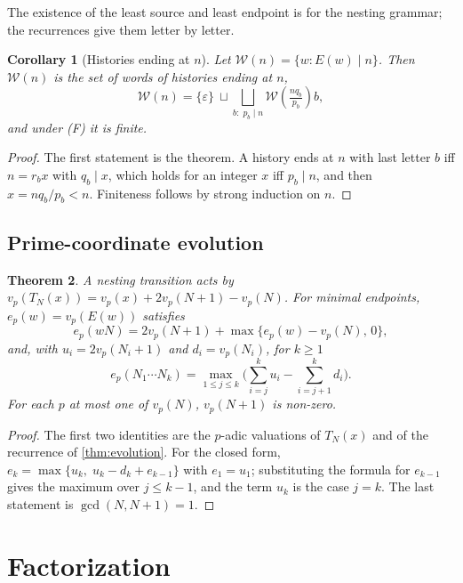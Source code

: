 \documentclass[11pt,a4paper]{article}
\newtheorem{theorem}{Theorem}[section]
\newtheorem{corollary}[theorem]{Corollary}
\begin{document}
The existence of the least source and least endpoint is \cite[Lemma~4.2]{monograph} for the nesting grammar; the recurrences give them letter by letter.

\begin{corollary}[Histories ending at \(n\)]\label{cor:words}
Let \(\mathcal W(n)=\{w:E(w)\mid n\}\). Then \(\mathcal W(n)\) is the
set of words of histories ending at \(n\),
\[\mathcal W(n)=\{\varepsilon\}\ \sqcup\bigsqcup_{b:\;p_b\mid n}\mathcal W\!\left(\tfrac{nq_b}{p_b}\right)b,\]
and under (F) it is finite.

\end{corollary}

\begin{proof}

The first statement is the theorem. A history ends at \(n\) with last
letter \(b\) iff \(n=r_bx\) with \(q_b\mid x\), which holds for an
integer \(x\) iff \(p_b\mid n\), and then \(x=nq_b/p_b<n\). Finiteness
follows by strong induction on \(n\).

\end{proof}

\subsection{Prime-coordinate
evolution}

\begin{theorem}\label{thm:prime}
A nesting transition acts by \(v_p(T_N(x))=v_p(x)+2v_p(N+1)-v_p(N)\).
For minimal endpoints, \(e_p(w)=v_p(E(w))\) satisfies
\[e_p(wN)=2v_p(N+1)+\max\{e_p(w)-v_p(N),\,0\},\] and, with
\(u_i=2v_p(N_i+1)\) and \(d_i=v_p(N_i)\), for \(k\ge1\)
\[e_p(N_1\cdots N_k)=\max_{1\le j\le k}\Big(\sum_{i=j}^{k}u_i-\sum_{i=j+1}^{k}d_i\Big).\]
For each \(p\) at most one of \(v_p(N)\), \(v_p(N+1)\) is non-zero.

\end{theorem}

\begin{proof}

The first two identities are the \(p\)-adic valuations of \(T_N(x)\) and
of the recurrence of \cref{thm:evolution}. For the closed form,
\(e_k=\max\{u_k,\;u_k-d_k+e_{k-1}\}\) with \(e_1=u_1\); substituting the
formula for \(e_{k-1}\) gives the maximum over \(j\le k-1\), and the
term \(u_k\) is the case \(j=k\). The last statement is
\(\gcd(N,N+1)=1\).

\end{proof}

\section{Factorization}
\end{document}
